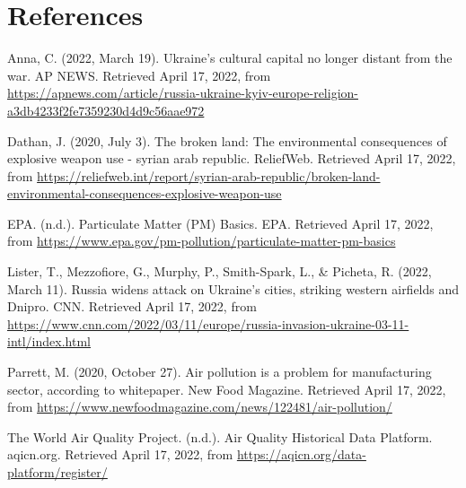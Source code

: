 \documentclass[
  12pt,
]{article}
\begin{document}
\newpage

\hypertarget{references}{%
\section{References}\label{references}}

Anna, C. (2022, March 19). Ukraine's cultural capital no longer distant
from the war. AP NEWS. Retrieved April 17, 2022, from
\url{https://apnews.com/article/russia-ukraine-kyiv-europe-religion-a3db4233f2fe7359230d4d9c56aae972}

Dathan, J. (2020, July 3). The broken land: The environmental
consequences of explosive weapon use - syrian arab republic. ReliefWeb.
Retrieved April 17, 2022, from
\url{https://reliefweb.int/report/syrian-arab-republic/broken-land-environmental-consequences-explosive-weapon-use}

EPA. (n.d.). Particulate Matter (PM) Basics. EPA. Retrieved April 17,
2022, from
\url{https://www.epa.gov/pm-pollution/particulate-matter-pm-basics}

Lister, T., Mezzofiore, G., Murphy, P., Smith-Spark, L., \& Picheta, R.
(2022, March 11). Russia widens attack on Ukraine's cities, striking
western airfields and Dnipro. CNN. Retrieved April 17, 2022, from
\url{https://www.cnn.com/2022/03/11/europe/russia-invasion-ukraine-03-11-intl/index.html}

Parrett, M. (2020, October 27). Air pollution is a problem for
manufacturing sector, according to whitepaper. New Food Magazine.
Retrieved April 17, 2022, from
\url{https://www.newfoodmagazine.com/news/122481/air-pollution/}

The World Air Quality Project. (n.d.). Air Quality Historical Data
Platform. aqicn.org. Retrieved April 17, 2022, from
\url{https://aqicn.org/data-platform/register/}
\end{document}
